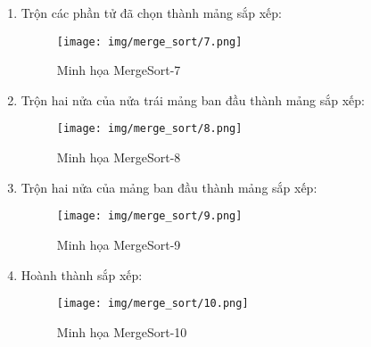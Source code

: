 \begin{enumerate}
    \item Trộn các phần tử đã chọn thành mảng sắp xếp:
    \begin{figure}[H]
        \centering
        \texttt{[image: img/merge\_sort/7.png]}
        \caption{Minh họa MergeSort-7}
    \end{figure}
    
    \item Trộn hai nửa của nửa trái mảng ban đầu thành mảng sắp xếp:
    \begin{figure}[H]
        \centering
        \texttt{[image: img/merge\_sort/8.png]}
        \caption{Minh họa MergeSort-8}
    \end{figure}
    
    \item Trộn hai nửa của mảng ban đầu thành mảng sắp xếp:
    \begin{figure}[H]
        \centering
        \texttt{[image: img/merge\_sort/9.png]}
        \caption{Minh họa MergeSort-9}
    \end{figure}
    
    \item Hoành thành sắp xếp:
    \begin{figure}[H]
        \centering
        \texttt{[image: img/merge\_sort/10.png]}
        \caption{Minh họa MergeSort-10}
    \end{figure}
\end{enumerate}

